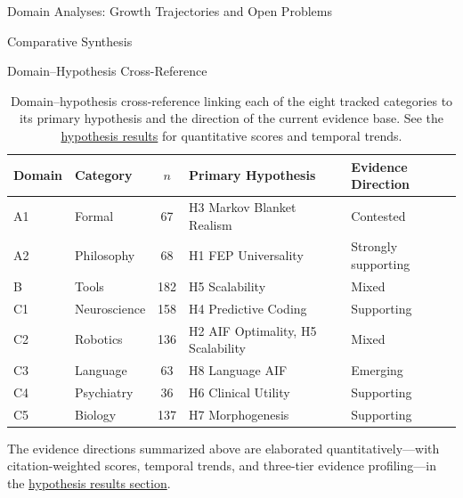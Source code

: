 \documentclass[
  ignorenonframetext,
]{beamer}
\begin{document}
\begin{frame}{Domain Analyses: Growth Trajectories and Open Problems
\label{sec:subfield_analyses}}
\begin{block}{Comparative Synthesis}
\begin{block}{Domain--Hypothesis Cross-Reference}
\begin{table}[htbp]
\centering
\caption{Domain--hypothesis cross-reference linking each of the eight tracked categories to its primary hypothesis and the direction of the current evidence base. See the \hyperref[sec:hypothesis_results]{hypothesis results} for quantitative scores and temporal trends.}
\label{tab:domain_hypothesis_crossref}
\begin{tabular}{llcll}
\toprule
\textbf{Domain} & \textbf{Category} & $n$ & \textbf{Primary Hypothesis} & \textbf{Evidence Direction} \\
\midrule
A1 & Formal & 67 & H3 Markov Blanket Realism & Contested \\
A2 & Philosophy & 68 & H1 FEP Universality & Strongly supporting \\
B & Tools & 182 & H5 Scalability & Mixed \\
C1 & Neuroscience & 158 & H4 Predictive Coding & Supporting \\
C2 & Robotics & 136 & H2 AIF Optimality, H5 Scalability & Mixed \\
C3 & Language & 63 & H8 Language AIF & Emerging \\
C4 & Psychiatry & 36 & H6 Clinical Utility & Supporting \\
C5 & Biology & 137 & H7 Morphogenesis & Supporting \\
\bottomrule
\end{tabular}
\end{table}

The evidence directions summarized above are elaborated
quantitatively---with citation-weighted scores, temporal trends, and
three-tier evidence profiling---in the
\hyperref[sec:hypothesis_results]{hypothesis results section}.
\end{block}
\end{block}
\end{frame}
\end{document}
